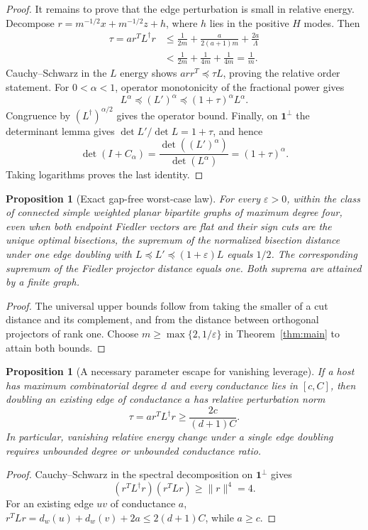 \documentclass[11pt]{article}
\newtheorem{proposition}[theorem]{Proposition}
\newcommand{\one}{\boldsymbol 1}
\begin{document}
\begin{proof}
It remains to prove that the edge perturbation is small in relative
energy. Decompose $r=m^{-1/2}x+m^{-1/2}z+h$, where $h$ lies in the
positive $H$ modes. Then
\begin{align*}
 \tau=a r^TL^\dagger r
 &\le\frac1{2m}+\frac{a}{2(a+1)m}+\frac{2a}{\Lambda}\\
 &<\frac1{2m}+\frac1{4m}+\frac1{4m}=\frac1m.
\end{align*}
Cauchy--Schwarz in the $L$ energy shows
$a rr^T\preceq\tau L$, proving the relative order statement.
For $0<\alpha<1$, operator monotonicity of the fractional power gives
\[
    L^\alpha\preceq(L')^\alpha\preceq(1+\tau)^\alpha L^\alpha.
\]
Congruence by $(L^\dagger)^{\alpha/2}$ gives the operator bound.
Finally, on $\one^\perp$ the determinant lemma gives
$\det L'/\det L=1+\tau$, and hence
\[
 \det(I+C_\alpha)
       =\frac{\det((L')^\alpha)}{\det(L^\alpha)}=(1+\tau)^\alpha.
\]
Taking logarithms proves the last identity.
\end{proof}

\begin{proposition}[Exact gap-free worst-case law]
For every $\varepsilon>0$, within the class of connected simple
weighted planar bipartite graphs of maximum degree four, even when
both endpoint Fiedler vectors are flat and their sign cuts are the
unique optimal bisections, the supremum of the normalized bisection
distance under one edge doubling with
$L\preceq L'\preceq(1+\varepsilon)L$ equals $1/2$.
The corresponding supremum of the Fiedler projector distance equals
one. Both suprema are attained by a finite graph.
\end{proposition}
\begin{proof}
The universal upper bounds follow from taking the smaller of a cut
distance and its complement, and from the distance between orthogonal
projectors of rank one. Choose $m\ge\max\{2,1/\varepsilon\}$ in
Theorem~\ref{thm:main} to attain both bounds.
\end{proof}

\begin{proposition}[A necessary parameter escape for vanishing leverage]
If a host has maximum combinatorial degree $d$ and every conductance
lies in $[c,C]$, then doubling an existing edge of conductance $a$ has
relative perturbation norm
\[
                 \tau=a r^TL^\dagger r
                          \ge\frac{2c}{(d+1)C}.
\]
In particular, vanishing relative energy change under a single edge
doubling requires unbounded degree or unbounded conductance ratio.
\end{proposition}
\begin{proof}
Cauchy--Schwarz in the spectral decomposition on $\one^\perp$ gives
\[
 (r^TL^\dagger r)(r^TLr)\ge\|r\|^4=4.
\]
For an existing edge $uv$ of conductance $a$,
$r^TLr=d_w(u)+d_w(v)+2a\le2(d+1)C$, while $a\ge c$.
\end{proof}
\end{document}

